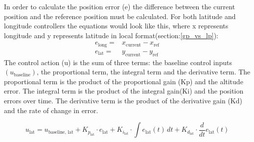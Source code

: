 \documentclass{report}
\begin{document}
In order to calculate the position error (e) the difference between the current
position and the reference position must be calculated. For both latitude and
longitude controllers the equations would look like this, where x represents
longitude and y represents latitude in local format(section:\ref{gp_vs_lp}):
\begin{align}
  e_{\text{long}} =&  x_{\text{current}} - x_{\text{ref}}
  \\
  e_{\text{lat}} =&  y_{\text{current}} - y_{\text{ref}}
\end{align}
The control action (u) is the sum of three terms: the baseline control
inputs\((u_{\text{baseline}})\), the proportional term, the integral term and
the derivative term. The proportional term is the product of the proportional
gain (Kp) and the altitude error. The integral term is the product of the
integral gain(Ki) and the position errors over time. The derivative term is the
product of the derivative gain (Kd) and the rate of change in error.

\begin{equation}
  u_{\text{lat}} = u_{\text{baseline, lat}} + K_{p_{\text{lat}}} \cdot e_{\text{lat}} + K_{i_{\text{lat}}} \cdot \int e_{\text{lat}}(t) \, dt + K_{d_{\text{lat}}} \cdot \frac{d}{dt}e_{\text{lat}}(t)
\end{equation}
\end{document}
